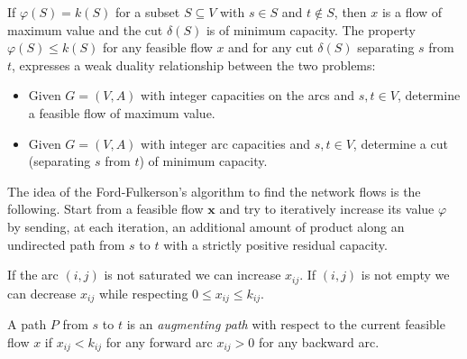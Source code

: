 \documentclass[12pt, a4paper]{report}
\begin{document}
    If $\varphi(S) = k(S)$ for a subset $S \subseteq V$ with $s \in S$ and $t \notin S$, then $x$ is a flow of maximum value and the cut $\delta(S)$ is of minimum capacity. 
    The property $\varphi(S) \leq k(S)$ for any feasible flow $x$ and for any cut $\delta(S)$ separating $s$ from $t$, expresses a weak duality relationship between the two problems:
    \begin{itemize}
        \item Given $G = (V,A)$ with integer capacities on the arcs and $s,t \in V$, determine a feasible flow of maximum value. 
        \item Given $G = (V,A)$ with integer arc capacities and $s,t \in V$, determine a cut (separating $s$ from $t$) of minimum capacity. 
    \end{itemize} 

    The idea of the Ford-Fulkerson's algorithm to find the network flows is the following. Start from a feasible flow $\boldsymbol{x}$ and try to iteratively increase its value $\varphi$ by 
    sending, at each iteration, an additional amount of product along an undirected path from $s$ to $t$ with a strictly positive residual capacity. 

    If the arc $(i,j)$ is not saturated we can increase $x_{ij}$. If $(i,j)$ is not empty we can decrease $x_{ij}$ while respecting $0 \leq x_{ij} \leq k_{ij}$. 
    \begin{definition}
        A path $P$ from $s$ to $t$ is an \emph{augmenting path} with respect to the current feasible flow $x$ if $x_{ij} <  k_{ij}$ for any
        forward arc $x_{ij}>0$ for any backward arc. 
    \end{definition}
\end{document}
